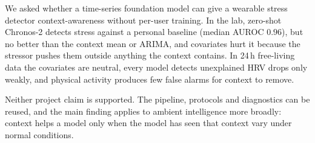 \documentclass[11pt,a4paper]{article}
\begin{document}
We asked whether a time-series foundation model can give a wearable stress detector context-awareness without per-user training. In the lab, zero-shot Chronos-2 detects stress against a personal baseline (median AUROC $0.96$), but no better than the context mean or ARIMA, and covariates hurt it because the stressor pushes them outside anything the context contains. In 24\,h free-living data the covariates are neutral, every model detects unexplained HRV drops only weakly, and physical activity produces few false alarms for context to remove.

Neither project claim is supported. The pipeline, protocols and diagnostics can be reused, and the main finding applies to ambient intelligence more broadly: context helps a model only when the model has seen that context vary under normal conditions.



\end{document}
